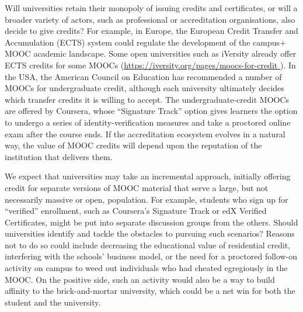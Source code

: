 Will  universities retain their monopoly
of issuing credits and certificates, or will a broader variety of actors,
such as professional or accreditation organisations, 
also decide to give credits?  
For example, in Europe, the European Credit Transfer and Accumulation
(ECTS) system could regulate the
development of the campus$+$MOOC academic landscape.  Some open
universities such as iVersity already offer ECTS credits for some MOOCs
(\url{https://iversity.org/pages/moocs-for-credit }). 
In the USA, the
American Council on Education has recommended a number of
MOOCs for undergraduate credit, although each university ultimately
decides which transfer credits it is willing to accept.
The undergraduate-credit MOOCs are
offered by Coursera, whose ``Signature Track'' option gives learners the
option to  undergo  a series of identity-verification measures and take
a proctored online exam after the course ends.
If the accreditation ecosystem evolves in a natural
way, the value of MOOC credits will depend upon the reputation of the
institution that delivers them.

We expect that universities may take an
incremental approach, initially offering
credit for separate versions of MOOC material that serve a large, but
not necessarily massive or open, population.
For example, students who sign up for ``verified''
enrollment, such as Coursera's Signature Track or edX Verified
Certificates, might be put
into separate discussion groups from the others.  
Should universities identify and tackle the obstacles to pursuing such scenarios?
Reasons not to do so could include decreasing the educational value of
residential credit, interfering with the schools' business model, or the
need for a proctored follow-on activity on campus to
weed out individuals who had cheated egregiously in the MOOC.  On the
positive side, such an activity would also be a way to build affinity to
the brick-and-mortar university, which could be a net win for both the
student and the university.
 


